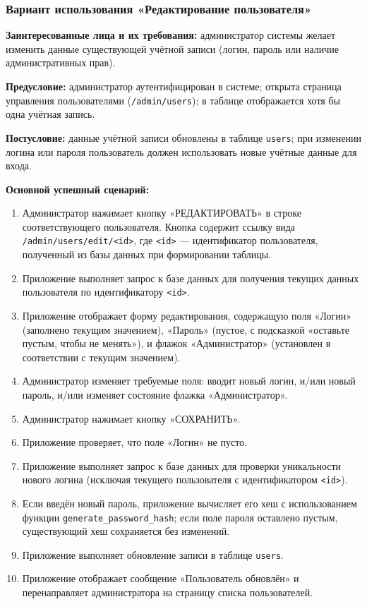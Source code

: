 \subsubsection{Вариант использования «Редактирование пользователя»}

\textbf{Заинтересованные лица и их требования:} администратор системы желает изменить данные существующей учётной записи (логин, пароль или наличие административных прав).

\textbf{Предусловие:} администратор аутентифицирован в системе; открыта страница управления пользователями (\texttt{/admin/users}); в таблице отображается хотя бы одна учётная запись.

\textbf{Постусловие:} данные учётной записи обновлены в таблице \texttt{users}; при изменении логина или пароля пользователь должен использовать новые учётные данные для входа.

\textbf{Основной успешный сценарий:}
\begin{enumerate}
	\item Администратор нажимает кнопку «РЕДАКТИРОВАТЬ» в строке соответствующего пользователя. Кнопка содержит ссылку вида \texttt{/admin/users/edit/<id>}, где \texttt{<id>} — идентификатор пользователя, полученный из базы данных при формировании таблицы.
	\item Приложение выполняет запрос к базе данных для получения текущих данных пользователя по идентификатору \texttt{<id>}.
	\item Приложение отображает форму редактирования, содержащую поля «Логин» (заполнено текущим значением), «Пароль» (пустое, с подсказкой «оставьте пустым, чтобы не менять»), и флажок «Администратор» (установлен в соответствии с текущим значением).
	\item Администратор изменяет требуемые поля: вводит новый логин, и/или новый пароль, и/или изменяет состояние флажка «Администратор».
	\item Администратор нажимает кнопку «СОХРАНИТЬ».
	\item Приложение проверяет, что поле «Логин» не пусто.
	\item Приложение выполняет запрос к базе данных для проверки уникальности нового логина (исключая текущего пользователя с идентификатором \texttt{<id>}).
	\item Если введён новый пароль, приложение вычисляет его хеш с использованием функции \texttt{generate\_password\_hash}; если поле пароля оставлено пустым, существующий хеш сохраняется без изменений.
	\item Приложение выполняет обновление записи в таблице \texttt{users}.
	\item Приложение отображает сообщение «Пользователь обновлён» и перенаправляет администратора на страницу списка пользователей.
\end{enumerate}

